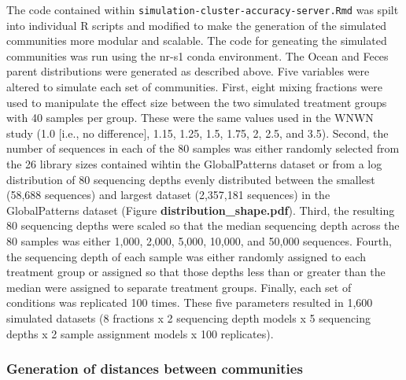 \documentclass[
]{article}
\begin{document}
The code contained within
\texttt{simulation-cluster-accuracy-server.Rmd} was spilt into
individual R scripts and modified to make the generation of the
simulated communities more modular and scalable. The code for geneating
the simulated communities was run using the nr-s1 conda environment. The
Ocean and Feces parent distributions were generated as described above.
Five variables were altered to simulate each set of communities. First,
eight mixing fractions were used to manipulate the effect size between
the two simulated treatment groups with 40 samples per group. These were
the same values used in the WNWN study (1.0 {[}i.e., no difference{]},
1.15, 1.25, 1.5, 1.75, 2, 2.5, and 3.5). Second, the number of sequences
in each of the 80 samples was either randomly selected from the 26
library sizes contained wihtin the GlobalPatterns dataset or from a log
distribution of 80 sequencing depths evenly distributed between the
smallest (58,688 sequences) and largest dataset (2,357,181 sequences) in
the GlobalPatterns dataset (Figure \textbf{distribution\_shape.pdf}).
Third, the resulting 80 sequencing depths were scaled so that the median
sequencing depth across the 80 samples was either 1,000, 2,000, 5,000,
10,000, and 50,000 sequences. Fourth, the sequencing depth of each
sample was either randomly assigned to each treatment group or assigned
so that those depths less than or greater than the median were assigned
to separate treatment groups. Finally, each set of conditions was
replicated 100 times. These five parameters resulted in 1,600 simulated
datasets (8 fractions x 2 sequencing depth models x 5 sequencing depths
x 2 sample assignment models x 100 replicates).

\hypertarget{generation-of-distances-between-communities}{%
\subsubsection{Generation of distances between
communities}\label{generation-of-distances-between-communities}}
\end{document}
